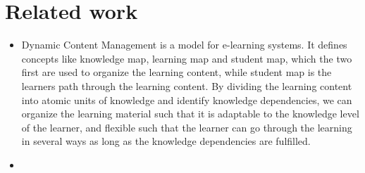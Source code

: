 \section{Related work}

\begin{itemize}
	\item Dynamic Content Management \parencite{Eide2008} is a model for e-learning systems. It defines concepts like knowledge map, learning map and student map, which the two first are used to organize the learning content, while student map is the learners path through the learning content. By dividing the learning content into atomic units of knowledge and identify knowledge dependencies, we can organize the learning material such that it is adaptable to the knowledge level of the learner, and flexible such that the learner can go through the learning in several ways as long as the knowledge dependencies are fulfilled.
	\item 

	\end{itemize}